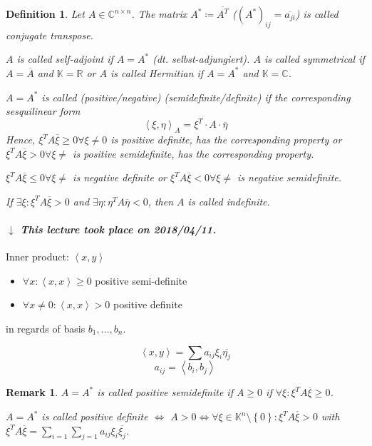 \documentclass{article}
\newtheorem{definition}{Definition}  \numberwithin{definition}{section}
\newtheorem{remark}{Remark}  \numberwithin{remark}{section}
\newcommand{\set}[1]{\left\{#1\right\}}
\newcommand{\angel}[1]{\left\langle#1\right\rangle}
\newcommand{\dateref}[1]{%
  \begin{mdframed}[backgroundcolor=gray!10,innerbottommargin=0pt,innertopmargin=0pt]
    \paragraph{\textit{$\downarrow$ This lecture took place on #1.}}%
  \end{mdframed}%
}
\begin{document}
\begin{definition} %
  Let $A \in \mathbb C^{n \times n}$.
  The matrix $A^* \coloneqq \overline{A^T}$ ($(A^*)_{ij} = \overline{a_{ji}}$)
  is called \emph{conjugate transpose}.

  $A$ is called \emph{self-adjoint} if $A = A^*$ (dt. \foreignlanguage{ngerman}{selbst-adjungiert}).
  $A$ is called \emph{symmetrical} if $A = \overline{A}$ and $\mathbb K = \mathbb R$
  or $A$ is called \emph{Hermitian} if $A = A^*$ and $\mathbb K = \mathbb C$.

  $A = A^*$ is called (positive/negative) (semidefinite/definite) if the corresponding sesquilinear form
  \[ \angel{\xi, \eta}_A = \xi^T \cdot A \cdot \overline{\eta} \]
  Hence, $\xi^T A \overline{\xi} \geq 0 \forall \xi \neq 0$ is positive definite, has the corresponding property or
  $\xi^T A \overline{\xi} > 0 \forall \xi \neq$ is positive semidefinite, has the corresponding property.

  $\xi^T A \overline{\xi} \leq 0 \forall \xi \neq$ is negative definite or
  $\xi^T A \overline{\xi} < 0 \forall \xi \neq$ is negative semidefinite.

  If $\exists \xi: \xi^T A \overline{\xi} > 0$ and $\exists \eta: \eta^T A \overline{\eta} < 0$, then $A$ is called indefinite.
\end{definition}

\dateref{2018/04/11}

Inner product: $\angel{x,y}$
\begin{itemize}
  \item $\forall x: \angel{x,x} \geq 0$ positive semi-definite
  \item $\forall x \neq 0: \angel{x,x} > 0$ positive definite
\end{itemize}
in regards of basis $b_1, \dots, b_n$.

\[ \angel{x,y} = \sum a_{ij} \xi_i \overline{\eta_j} \]
\[ a_{ij} = \angel{b_i, b_j} \]

\begin{remark}
  $A = A^*$ is called \emph{positive semidefinite} if $A \geq 0$ if $\forall \xi: \xi^T A \overline{\xi} \geq 0$.

  $A = A^*$ is called \emph{positive definite} $\iff$ $A > 0 \iff \forall \xi \in \mathbb K^n\setminus \set{0}: \xi^T A \overline{\xi} > 0$
  with $\xi^T A \overline{\xi} = \sum_{i=1} \sum_{j=1} a_{ij} \xi_i \overline{\xi_j}$.
\end{remark}
\end{document}
